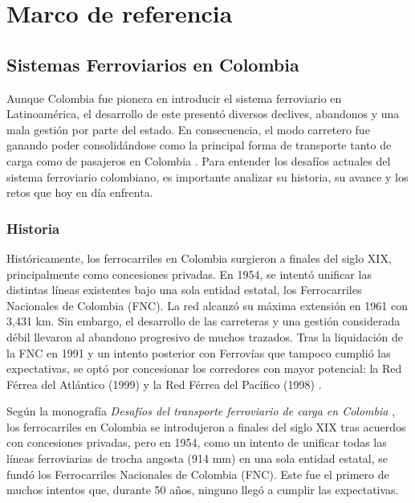 
\chapter{Marco de referencia}

\section{Sistemas Ferroviarios en Colombia}

Aunque Colombia fue pionera en introducir el sistema ferroviario en Latinoamérica, el desarrollo de este presentó diversos declives, abandonos y una mala gestión por parte del estado. En consecuencia, el modo carretero fue ganando poder consolidándose como la principal forma de transporte tanto de carga como de pasajeros en Colombia \autocite{iabdDesafios}. Para entender los desafíos actuales del sistema ferroviario colombiano, es importante analizar su historia, su avance y los retos que hoy en día enfrenta.

\subsection{Historia}

Históricamente, los ferrocarriles en Colombia surgieron a finales del siglo XIX, principalmente como concesiones privadas. En 1954, se intentó unificar las distintas líneas existentes bajo una sola entidad estatal, los Ferrocarriles Nacionales de Colombia (FNC). La red alcanzó su máxima extensión en 1961 con 3{,}431 km. Sin embargo, el desarrollo de las carreteras y una gestión considerada débil llevaron al abandono progresivo de muchos trazados. Tras la liquidación de la FNC en 1991 y un intento posterior con Ferrovías que tampoco cumplió las expectativas, se optó por concesionar los corredores con mayor potencial: la Red Férrea del Atlántico (1999) y la Red Férrea del Pacífico (1998) \autocite{iabdDesafios}.

Según la monografía \textit{Desafíos del transporte ferroviario de carga en Colombia} \autocite{iabdDesafios}, los ferrocarriles en Colombia se introdujeron a finales del siglo XIX tras acuerdos con concesiones privadas, pero en 1954, como un intento de unificar todas las líneas ferroviarias de trocha angosta (914 mm) en una sola entidad estatal, se fundó los Ferrocarriles Nacionales de Colombia (FNC). Este fue el primero de muchos intentos que, durante 50 años, ninguno llegó a cumplir las expectativas.

